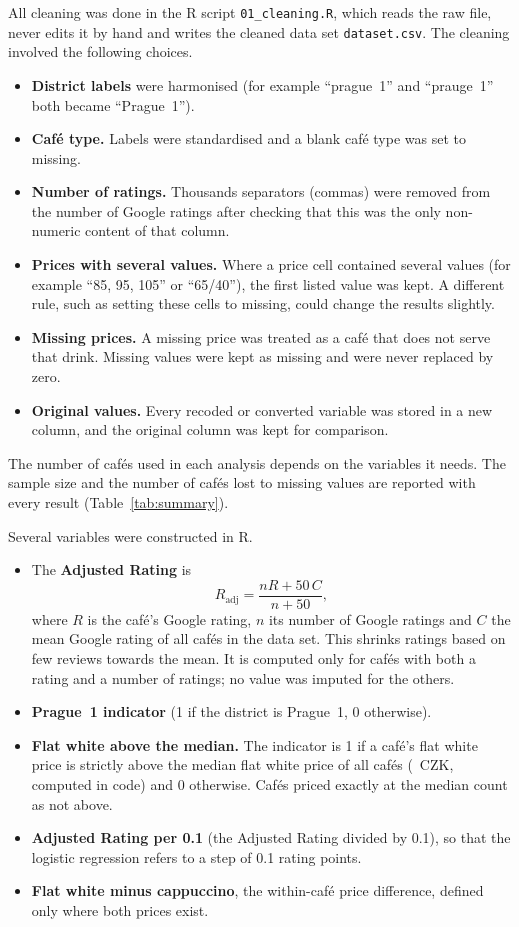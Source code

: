 \documentclass[11pt,a4paper]{article}
\begin{document}
All cleaning was done in the R script \texttt{01\_cleaning.R}, which reads the raw file, never edits it by hand and writes the cleaned data set \texttt{dataset.csv}. The cleaning involved the following choices.
\begin{itemize}
  \item \textbf{District labels} were harmonised (for example ``prague~1'' and ``prauge~1'' both became ``Prague~1'').
  \item \textbf{Caf\'e type.} Labels were standardised and a blank caf\'e type was set to missing.
  \item \textbf{Number of ratings.} Thousands separators (commas) were removed from the number of Google ratings after checking that this was the only non-numeric content of that column.
  \item \textbf{Prices with several values.} Where a price cell contained several values (for example ``85, 95, 105'' or ``65/40''), the first listed value was kept. A different rule, such as setting these cells to missing, could change the results slightly.
  \item \textbf{Missing prices.} A missing price was treated as a caf\'e that does not serve that drink. Missing values were kept as missing and were never replaced by zero.
  \item \textbf{Original values.} Every recoded or converted variable was stored in a new column, and the original column was kept for comparison.
\end{itemize}
The number of caf\'es used in each analysis depends on the variables it needs. The sample size and the number of caf\'es lost to missing values are reported with every result (Table~\ref{tab:summary}).

Several variables were constructed in R.
\begin{itemize}
  \item The \textbf{Adjusted Rating} is
  \[
    R_{\text{adj}} = \frac{nR + 50\,C}{n + 50},
  \]
  where $R$ is the caf\'e's Google rating, $n$ its number of Google ratings and $C$ the mean Google rating of all caf\'es in the data set. This shrinks ratings based on few reviews towards the mean. It is computed only for caf\'es with both a rating and a number of ratings; no value was imputed for the others.
  \item \textbf{Prague~1 indicator} (1 if the district is Prague~1, 0 otherwise).
  \item \textbf{Flat white above the median.} The indicator is 1 if a caf\'e's flat white price is strictly above the median flat white price of all caf\'es (\AFiveMedian{}~CZK, computed in code) and 0 otherwise. Caf\'es priced exactly at the median count as not above.
  \item \textbf{Adjusted Rating per 0.1} (the Adjusted Rating divided by 0.1), so that the logistic regression refers to a step of 0.1 rating points.
  \item \textbf{Flat white minus cappuccino}, the within-caf\'e price difference, defined only where both prices exist.
\end{itemize}
\end{document}
